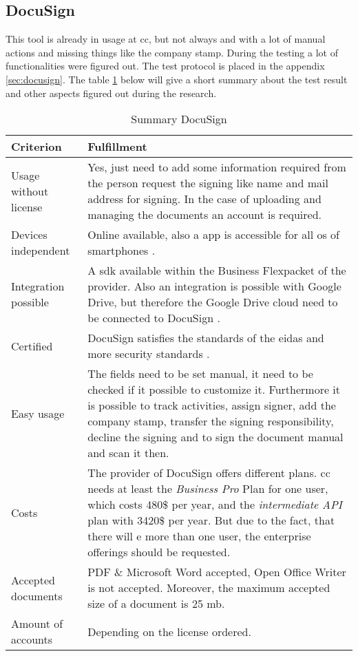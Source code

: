 \subsection{DocuSign}
This tool is already in usage at \gls{cc}, but not always and with a lot of manual actions and missing things like the company stamp. During the testing a lot of functionalities were figured out. The test protocol is placed in the appendix \ref{sec:docusign}. The table \ref{tab:docusign} below will give a short summary about the test result and other aspects figured out during the research.

\begin{table}[h!]
	\begin{tabular}{|p{4cm}|p{10cm}|} \hline
		Criterion & Fulfillment \\ \hline
		Usage without license & Yes, just need to add some information required from the person request the signing like name and mail address for signing. In the case of uploading and managing the documents an account is required.\\ \hline
		Devices independent & Online available, also a \gls{app} is accessible for all \gls{os} of smartphones \parencite{docusign2018mobile}. \\ \hline
		Integration possible & A \gls{sdk} available within the \grqq Business Flex\grqq packet of the provider. Also an integration is possible with Google Drive, but therefore the Google Drive cloud need to be connected to DocuSign \parencite{docusign2018integration,docusign2018formats}. \\ \hline
		Certified & DocuSign satisfies the standards of the \gls{eidas} and more security standards \parencite{docusign2018certificates,docusign2018legal}. \\ \hline
		Easy usage & The fields need to be set manual, it need to be checked if it possible to customize it. Furthermore it is possible to track activities, assign signer, add the company stamp, transfer the signing responsibility, decline the signing and to sign the document manual and scan it then. \\ \hline
		Costs & The provider of DocuSign offers different plans. \Gls{cc} needs at least the \textit{Business Pro} Plan for one user, which costs 480\$ per year, and the \textit{intermediate API} plan with 3420\$ per year. But due to the fact, that there will  e more than one user, the enterprise offerings should be requested. \parencite{docusign2018api,docusign2018user} \\ \hline
		Accepted documents & PDF \& Microsoft Word accepted, Open Office Writer is not accepted. Moreover, the maximum accepted size of a document is 25 \gls{mb}. \parencite{docusign2018formats} \\ \hline
		Amount of accounts & Depending on the license ordered.\\ \hline
	\end{tabular}
	\caption{Summary DocuSign}
	\label{tab:docusign}
\end{table}


